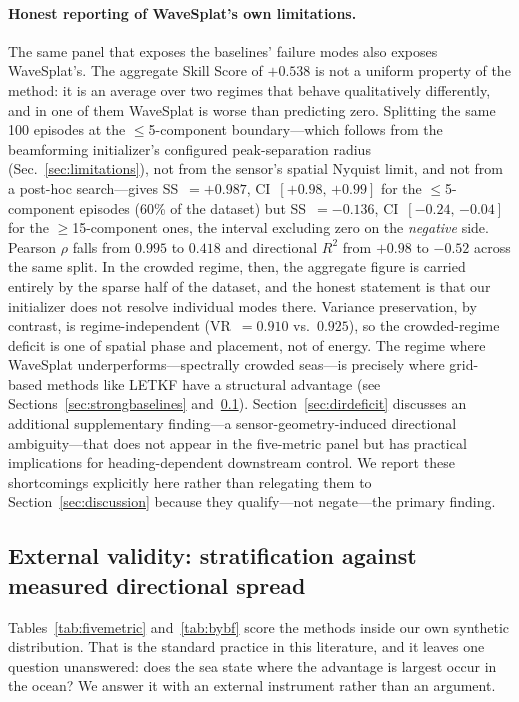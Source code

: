\paragraph{Honest reporting of WaveSplat's own limitations.}
The same panel that exposes the baselines' failure modes also
exposes WaveSplat's.  The aggregate Skill Score of $+0.538$ is not a
uniform property of the method: it is an average over two regimes that
behave qualitatively differently, and in one of them WaveSplat is worse
than predicting zero.
Splitting the same 100 episodes at the $\leq$5-component
boundary---which follows from the beamforming initializer's configured
peak-separation radius (Sec.~\ref{sec:limitations}), not from the sensor's
spatial Nyquist limit, and not from a post-hoc search---gives
SS~$=+0.987$, CI~$[{+0.98},\,{+0.99}]$ for the $\leq$5-component episodes
(60\% of the dataset) but SS~$=-0.136$, CI~$[{-0.24},\,{-0.04}]$ for the
$\geq$15-component ones, the interval excluding zero on the
\emph{negative} side.  Pearson $\rho$ falls from $0.995$ to $0.418$ and
directional $R^2$ from $+0.98$ to $-0.52$ across the same split.
In the crowded regime, then, the aggregate figure is carried entirely by
the sparse half of the dataset, and the honest statement is that our
initializer does not resolve individual modes there.
Variance preservation, by contrast, is regime-independent
(VR~$=0.910$ vs.\ $0.925$), so the crowded-regime deficit is one of
spatial phase and placement, not of energy.
The regime where WaveSplat underperforms---spectrally crowded seas---is
precisely where grid-based methods like LETKF have a structural
advantage (see Sections~\ref{sec:strongbaselines}
and~\ref{sec:extvalidity}).
Section~\ref{sec:dirdeficit} discusses an additional supplementary
finding---a sensor-geometry-induced directional ambiguity---that does
not appear in the five-metric panel but has practical implications for
heading-dependent downstream control.
We report these shortcomings explicitly here rather than relegating them
to Section~\ref{sec:discussion} because they qualify---not negate---the
primary finding.

\subsection{External validity: stratification against measured directional spread}
\label{sec:extvalidity}

Tables~\ref{tab:fivemetric} and~\ref{tab:bybf} score the methods inside our own
synthetic distribution.  That is the standard practice in this literature, and
it leaves one question unanswered: does the sea state where the advantage is
largest occur in the ocean?  We answer it with an external instrument rather
than an argument.

